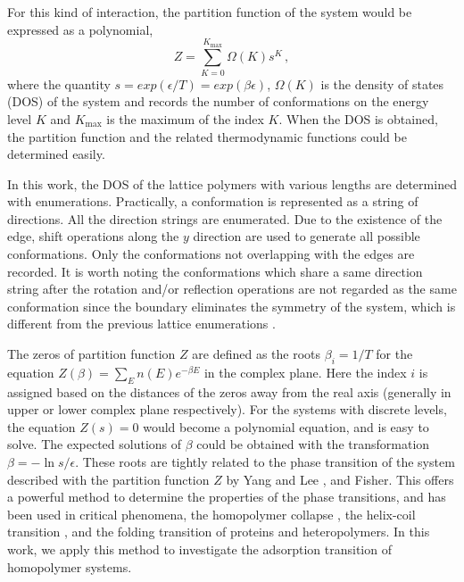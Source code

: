 \documentclass[aps,pre,twocolumn,showpacs,preprintnumbers,amsmath,amssymb]{revtex4-1}
\begin{document}
For this kind of interaction, the partition function of the system would be
expressed as a polynomial,
\begin{equation}
Z=\sum_{K=0}^{K_{\text{max}}} \Omega(K) s^K \, ,
\end{equation}
where the quantity $s=exp(\epsilon/T)=exp(\beta\epsilon)$, $\Omega(K)$ is
the density of states (DOS) of the system and records the number
of conformations on the energy level $K$ and $K_{\text{max}}$ is the
maximum of the index $K$. When the DOS is obtained, the partition function
and the related thermodynamic functions could be determined easily.

In this work, the DOS of the lattice polymers with various lengths are
determined with enumerations. Practically, a conformation is represented
as a string of directions. All the direction strings are enumerated.
Due to the existence of the edge, shift operations along the $y$ direction
are used to generate all possible conformations. Only the conformations
not overlapping with the edges
are recorded. It is worth noting the conformations which share a same
direction string after the rotation and/or reflection operations are not
regarded as the same conformation since the boundary eliminates the
symmetry of the system, which is different from the previous lattice
enumerations \cite{CieplakPRL98,PandePRL96}.


The zeros of partition function $Z$ are defined as the roots $\beta_i=1/T$
for the equation $Z(\beta)=\sum_E n(E)e^{-\beta E}$ in the complex plane.
Here the index $i$ is assigned based on the distances of the zeros away
from the real axis (generally in upper or lower complex plane respectively).
For the systems with discrete levels, the equation $Z(s)=0$ would become
a polynomial equation, and is easy to solve. The expected solutions of
$\beta$ could be obtained with the transformation $\beta=-\ln s/\epsilon$.
These roots are tightly related to the phase transition
of the system described with the partition function $Z$ by Yang and Lee
\cite{LYPR52}, and Fisher\cite{FisherBook}. This offers a powerful method
to determine the properties of the phase transitions, and has been used
in critical phenomena\cite{LipowskiIJMPB05}, the homopolymer collapse
\cite{JCP10b}, the helix-coil transition
\cite{HansmannPRL00,HansmannPA01}, and the folding transition of
proteins and heteropolymers\cite{WangJCP03,ChenPA05}.
In this work, we apply this method to investigate
the adsorption transition of homopolymer systems.
\end{document}
